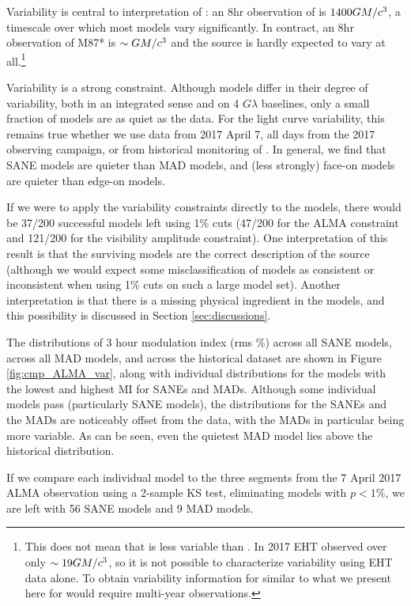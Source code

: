 Variability is central to interpretation of \sgra: an $8$hr observation of \sgra is $1400 GM/c^3$, a timescale over which most models vary significantly.  In contract, an $8$hr observation of M87* is $\sim GM/c^3$ and the source is hardly expected to vary at all.\footnote{This does not mean that  is less variable than \sgra.  In 2017 EHT observed  over only $\sim 19GM/c^3$, so it is not possible to characterize  variability using EHT data alone.  To obtain variability information for  similar to what we present here for \sgra would require multi-year observations.}

Variability is a strong constraint.  Although models differ in their degree of variability, both in an integrated sense and on 4 $G\lambda$ baselines, only a small fraction of models are as quiet as the data.  For the light curve variability, this remains true whether we use data from 2017 April 7, all days from the 2017 observing campaign, or from historical monitoring of \sgra.   In general, we find that SANE models are quieter than MAD models, and (less strongly) face-on models are quieter than edge-on models.

If we were to apply the variability constraints directly to the models, there would be 37/200 successful models left using 1\% cuts (47/200 for the ALMA constraint and 121/200 for the visibility amplitude constraint).  One interpretation of this result is that the surviving models are the correct description of the source (although we would expect some misclassification of models as consistent or inconsistent when using 1\% cuts on such a large model set).  Another interpretation is that there is a missing physical ingredient in the models, and this possibility is discussed in Section \ref{sec:discussions}.


The distributions of 3 hour modulation index (rms \%) across all SANE models, across all MAD models, and across the historical dataset are shown in Figure \ref{fig:cmp_ALMA_var}, along with individual distributions for the models with the lowest and highest MI for SANEs and MADs. Although some individual models  pass (particularly SANE models), the distributions for the SANEs and the MADs are noticeably offset from the data, with the MADs in particular being more variable. As can be seen, even the quietest MAD model lies above the historical distribution.

If we compare each individual model to the three segments from the 7 April 2017 ALMA observation using a 2-sample KS test, eliminating models with $p < 1\%$, we are left with 56 SANE models and 9 MAD models.

